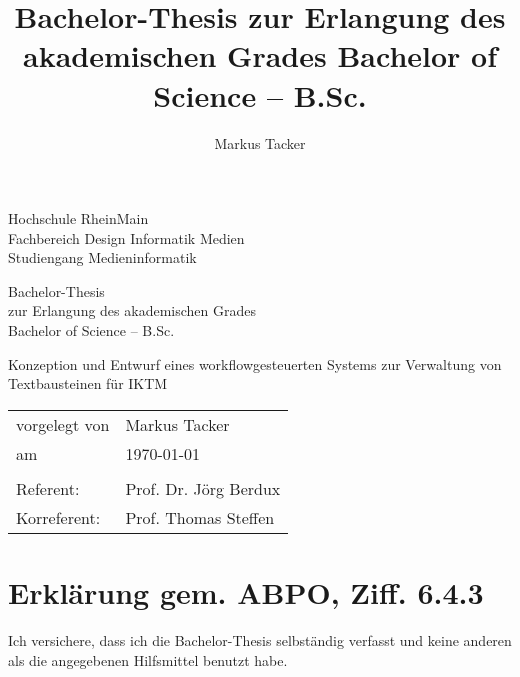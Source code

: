 \documentclass[11pt,a4paper]{article}
\begin{document}


\author{Markus Tacker}
\title{Bachelor-Thesis zur Erlangung des akademischen Grades Bachelor of Science – B.Sc.}

\begin{center}

\begin{small}

Hochschule RheinMain\\Fachbereich Design Informatik Medien\\Studiengang Medieninformatik

\vspace{1cm}

Bachelor-Thesis\\zur Erlangung des akademischen Grades\\Bachelor of Science – B.Sc.

\end{small}

\vspace{2cm}

\begin{huge}

Konzeption und Entwurf eines workflowgesteuerten Systems zur Verwaltung von Textbausteinen für \acl{IKTM}

\end{huge}

\end{center}

\vspace{8cm}

\begin{tabular}{@{}l l}
vorgelegt von & Markus Tacker\\
am & \today\\
& \\
Referent: & Prof. Dr. Jörg Berdux\\
Korreferent: & Prof. Thomas Steffen
\end{tabular}

\pagebreak

\section*{Erklärung gem. ABPO, Ziff. 6.4.3}

Ich versichere, dass ich die Bachelor-Thesis selbständig verfasst und keine anderen als
die angegebenen Hilfsmittel benutzt habe.

\vspace{1cm}
\end{document}
